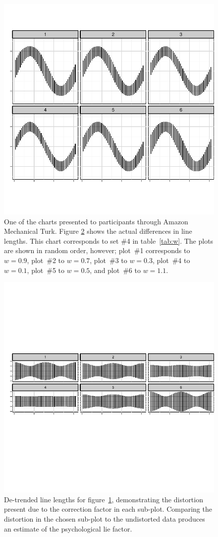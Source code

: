 \documentclass[11pt]{isuthesis}\usepackage[]{graphicx}\usepackage[]{color}
\begin{document}
\begin{figure}
\centering
\includegraphics[width=.8\linewidth]{fig-stimulicorrectionsize1}
\caption[Sample experimental stimulus]{One of the charts presented to participants through Amazon Mechanical Turk. Figure \ref{fig:sinestimulinotrend} shows the actual differences in line lengths. This chart corresponds to set \#4 in table~\ref{tab:w}. The plots are shown in random order, however; plot~\#1 corresponds to $w=0.9$, plot~\#2 to $w=0.7$, plot~\#3 to $w=0.3$, plot~\#4 to $w=0.1$, plot~\#5 to $w=0.5$, and plot~\#6 to $w=1.1$.}\label{fig:sinestimuli}
\end{figure}

\begin{figure}
\centering
\includegraphics[width=.6\linewidth, trim=.65in 0in .65in 0in]{fig-stimulicorrectionsize2}
\caption[Effect of the transformation]{De-trended line lengths for figure~\ref{fig:sinestimuli}, demonstrating the distortion present due to the correction factor in each sub-plot. Comparing the distortion in the chosen sub-plot to the undistorted data produces an estimate of the psychological lie factor. }\label{fig:sinestimulinotrend}
\end{figure}
\end{document}
